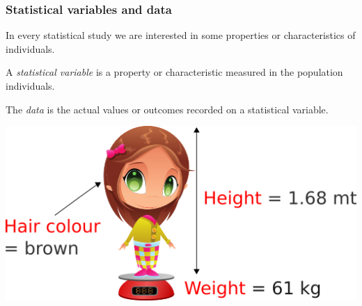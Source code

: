 \begin{frame}
\frametitle{Statistical variables and data}
In every statistical study we are interested in some properties or characteristics of individuals. 
\begin{definition}
A \emph{statistical variable} is a property or characteristic measured in the population individuals. 

The \emph{data} is the actual values or outcomes recorded on a statistical variable. 
\end{definition}

\begin{center}
\includegraphics[scale=0.5]{img/introduction/statistical_variables.png}
\end{center}
\end{frame}


